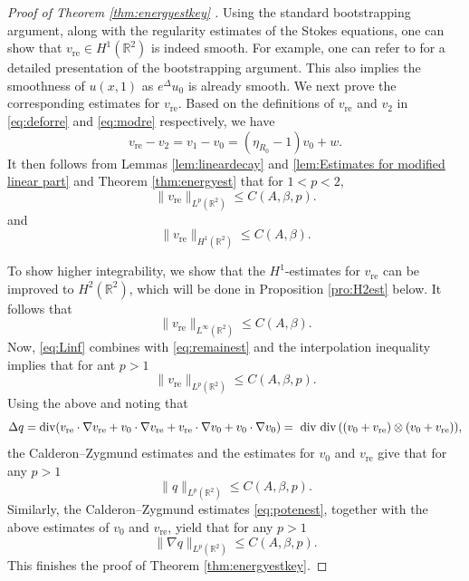 \documentclass[12pt]{amsart}
\renewcommand{\div}{{\rm div \thinspace }}
\numberwithin{equation}{section}              %
\theoremstyle{remark}
\begin{document}
		\begin{proof}[Proof of Theorem \ref{thm:energyestkey} ]
			Using the standard bootstrapping argument, along
			with the regularity estimates of the Stokes equations, one can show that $v_{\text{re}}\in H^1(\mathbb{R}^2)$ is indeed smooth. For example, one can refer to \cite[Theorem 3.8]{Yang26} for a detailed presentation of the bootstrapping argument.
			This also implies the smoothness of $u(x,1)$ as $e^{\Delta} u_0$ is already smooth.	We next prove the corresponding estimates for $v_{\text{re}}$.	Based on the definitions of $v_{\textrm{re}}$ and $v_2$ in \eqref{eq:deforre} and \eqref{eq:modre} respectively, we have
			\begin{equation*}
				v_{\textrm{re}} - v_2 =v_1 -v_0 = (\eta_{R_0}-1)v_0 +w.
			\end{equation*}
			It then follows from Lemmas \ref{lem:lineardecay} and  \ref{lem:Estimates for modified linear part} and 
			Theorem \ref{thm:energyest} that for $1<p<2$, 
			\begin{equation}\label{eq:remainest}
				\|v_{\text{re}} \|_{L^{p}(\mathbb{R}^2)}\leq C(A,\beta, p).
			\end{equation}
			and  
			\begin{equation*}
				\|v_{\text{re}} \|_{H^1(\mathbb{R}^2)}\le C(A,\beta).
			\end{equation*}
            
            To show higher integrability, we show that the $H^1$-estimates for $v_{\textrm{re}}$ can be improved to $H^2(\mathbb{R}^2)$, which will be done in Proposition \ref{pro:H2est} below.
			It follows that
			\begin{equation}\label{eq:Linf}
				\|v_{\text{re}} \|_{L^{\infty}(\mathbb{R}^2)}\le C(A,\beta).
			\end{equation}
			Now, \eqref{eq:Linf} combines with  \eqref{eq:remainest} and the interpolation inequality implies that for ant $p>1$
			\begin{equation*}
				\|v_{\text{re}} \|_{L^{p}(\mathbb{R}^2)}\leq C(A,\beta, p).
			\end{equation*}
			Using the above and noting that
			\begin{equation*}
				\Delta 	q = \operatorname{div} (v_{\text{re}} \cdot \nabla v_{\text{re}} + v_0 \cdot \nabla v_{\text{re}} + v_{\text{re}} \cdot \nabla v_0 + v_0 \cdot \nabla v_0)= \textrm{ div } \div (( v_0 +v_{\text{re}} ) \otimes( v_0 +v_{\text{re}} ) ),
			\end{equation*}
			the  Calderon–Zygmund  estimates and the estimates for $v_0$ and $v_{\text{re}}$ give that for any $p>1$ 
			\begin{equation*}
				\|q \|_{L^{p}(\mathbb{R}^2)}\leq C(A,\beta, p).
			\end{equation*}
			Similarly, the Calderon–Zygmund  estimates \eqref{eq:potenest}, together with 
            the above estimates of $v_0$ and $v_{\text{re}}$,
            yield that for any $p>1$ 
			\begin{equation*}
				\|\nabla q \|_{L^{p}(\mathbb{R}^2)}\le C(A,\beta,p).
			\end{equation*}
            This finishes the proof of Theorem \ref{thm:energyestkey}.
		\end{proof}
		
\end{document}
